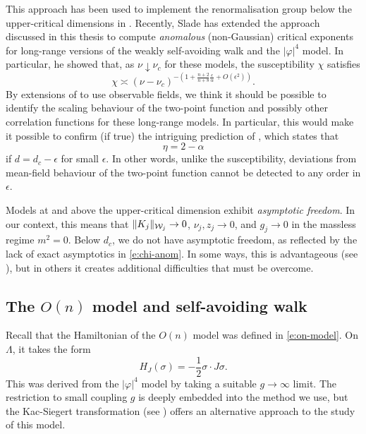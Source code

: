 This approach has been used to implement the renormalisation group below the
upper-critical dimensions in \cite{BDH98,MS00,BMS03,Abde07}. Recently, Slade
\cite{Slad17} has extended the approach discussed in this thesis to compute
\emph{anomalous} (non-Gaussian) critical exponents for long-range versions of
the weakly self-avoiding walk and the $|\varphi|^4$ model. In particular, he
showed that, as $\nu\downarrow\nu_c$ for these models, the susceptibility $\chi$
satisfies
\begin{equation}
\label{e:chi-anom}
\chi
	\asymp
(\nu - \nu_c)^{-\left(1 + \tfrac{n+2}{n+8} \tfrac{\epsilon}{\alpha} + O(\epsilon^2)\right)}.
\end{equation}
By extensions of \cite{Slad17} to use observable fields, we think it should
be possible to identify the scaling behaviour of the two-point function and possibly
other correlation functions for these long-range models. In particular, this would
make it possible to confirm (if true) the intriguing prediction of \cite{FMN72}, which
states that
\begin{equation}
\eta = 2 - \alpha
\end{equation}
if $d = d_c - \epsilon$ for small $\epsilon$. In other words, unlike the susceptibility,
deviations from mean-field behaviour of the two-point function cannot be detected
to any order in $\epsilon$.

\begin{rk}
Models at and above the upper-critical dimension exhibit \emph{asymptotic freedom}.
In our context, this means that $\|K_j\|_{\mathcal{W}_j} \rightarrow 0$,
$\nu_j, z_j \to 0$, and $g_j \to 0$ in the massless regime $m^2 = 0$. Below $d_c$, we do
not have asymptotic freedom, as reflected by the lack of exact asymptotics in
\eqref{e:chi-anom}. In some ways, this is advantageous (see \cite{Slad17}), but
in others it creates additional difficulties that must be overcome.
\end{rk}


\subsection{The \texorpdfstring{$O(n)$}{O(n)} model and self-avoiding walk}
\label{sec:hard-core}

Recall that the Hamiltonian of the $O(n)$ model was defined in \eqref{e:on-model}.
On $\Lambda$, it takes the form
\begin{equation}
H_J(\sigma)
	=
-\frac12 \sigma \cdot J \sigma.
\end{equation}
This was derived from the $|\varphi|^4$ model by taking a suitable
$g\to\infty$ limit. The restriction to small coupling $g$ is deeply embedded into
the method we use, but the Kac-Siegert transformation (see \cite{Bryd09}) offers
an alternative approach to the study of this model.

